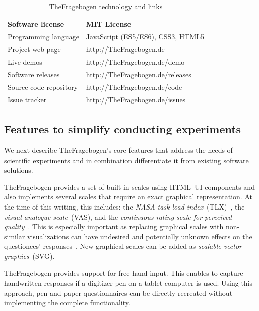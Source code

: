\documentclass[conference,a4paper]{IEEEtran}
\newcommand{\url}[1]{#1}
\begin{document}
\begin{table}
    \caption{TheFragebogen technology and links}
    \begin{center}
    	\begin{tabular}{| l | l |}
    	\hline
    	Software license & MIT License \\
    	\hline
    	Programming language & JavaScript (ES5/ES6), CSS3, HTML5 \\
    	\hline
    	\hline

    	Project web page & \url{http://TheFragebogen.de} \\
    	\hline
    	Live demos & \url{http://TheFragebogen.de/demo} \\
    	\hline
    	Software releases & \url{http://TheFragebogen.de/releases} \\
    	\hline
    	Source code repository & \url{http://TheFragebogen.de/code} \\
    	\hline
    	Issue tracker & \url{http://TheFragebogen.de/issues} \\
    	\hline
    	\end{tabular}
    \end{center}
    \vspace{-2.5em}
\end{table}

\subsection{Features to simplify conducting experiments}
We next describe TheFragebogen's core features that address the needs of scientific experiments and in combination differentiate it from existing software solutions.

TheFragebogen provides a set of built-in scales using HTML~UI components and also implements several scales that require an exact graphical representation.
At the time of this writing, this includes: the \emph{NASA task load index}~(TLX)~\cite{hart_development_1988}, the \emph{visual analogue scale}~(VAS), and the \emph{continuous rating scale for perceived quality}~\cite[p.\,19]{itu-t_recommendation_p.851_subjective_2003}.
This is especially important as replacing graphical scales with non-similar visualizations can have undesired and potentially unknown effects on the questionees' responses~\cite{funke_webExperiment_2016}.
New graphical scales can be added as \emph{scalable vector graphics}~(SVG).

TheFragebogen provides support for free-hand input.
This enables to capture handwritten responses if a digitizer pen on a tablet computer is used.
Using this approach, pen-and-paper questionnaires can be directly recreated without implementing the complete functionality.
\end{document}
